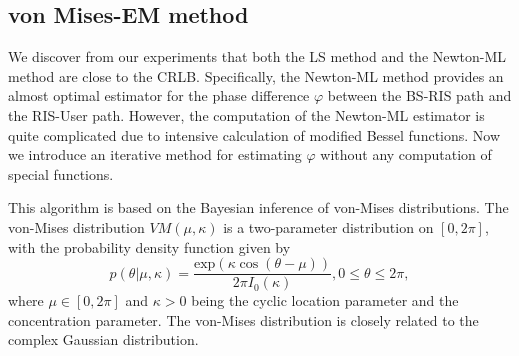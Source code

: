 \documentclass[12pt,draftclsnofoot,journal,onecolumn]{IEEEtran}
\theoremstyle{nonumberplain}
\def \exp {\text{exp}}
\begin{document}
\subsection{von Mises-EM method}
    We discover from our experiments that both the LS method and the Newton-ML method are close to the CRLB. Specifically, the Newton-ML method provides an almost optimal estimator for the phase difference $\varphi$ between the BS-RIS path and the RIS-User path. However, the computation of the Newton-ML estimator is quite complicated due to intensive calculation of modified Bessel functions. Now we introduce an iterative method for estimating $\varphi$ without any computation of special functions.

    This algorithm is based on the Bayesian inference of von-Mises distributions. The von-Mises distribution $VM(\mu, \kappa)$ is a two-parameter distribution on $[0, 2\pi]$, with the probability density function given by 
    \begin{equation}
        p(\theta|\mu, \kappa) = \frac{\exp(\kappa \cos(\theta - \mu))}{2\pi I_0(\kappa)}, 0\leq \theta \leq 2\pi,
    \end{equation}
    where $\mu \in [0,2\pi]$ and $\kappa >0$ being the cyclic location parameter and the concentration parameter. The von-Mises distribution is closely related to the complex Gaussian distribution.
    
\end{document}
